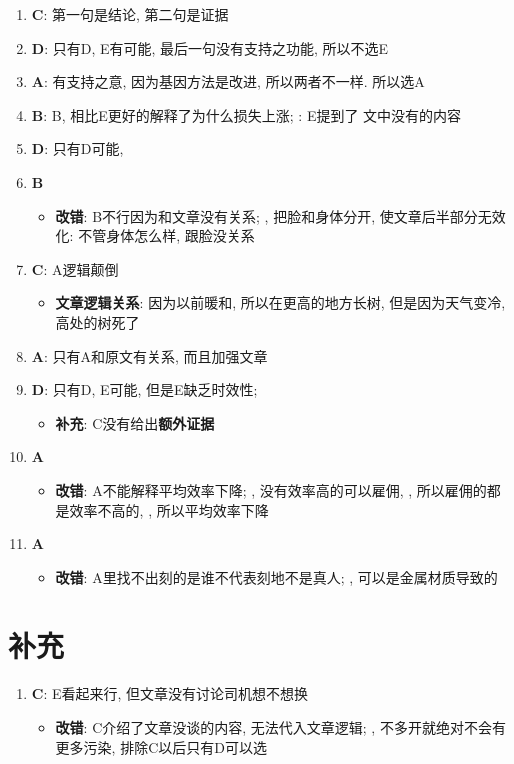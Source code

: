   \begin{enumerate}
    \item \textbf{C}: 第一句是结论, 第二句是证据
    \item \textbf{D}: 只有D, E有可能, 最后一句没有支持之功能, 所以不选E
    \item \textbf{A}: 有支持之意, 因为基因方法是改进, 所以两者不一样.
    所以选A
    \item \textbf{B}: B, 相比E更好的解释了为什么损失上涨; : E提到了
    文中没有的内容
    \item \textbf{D}: 只有D可能, 
    \item \textbf{B}
    \begin{itemize}
      \item \textbf{改错}: B不行因为和文章没有关系;
      , 把脸和身体分开, 使文章后半部分无效化: 不管身体怎么样, 跟脸没关系
    \end{itemize}

    \item \textbf{C}: A逻辑颠倒
    \begin{itemize}
      \item \textbf{文章逻辑关系}: 因为以前暖和, 所以在更高的地方长树, 但是因为天气变冷,
      高处的树死了
    \end{itemize}

    \item \textbf{A}: 只有A和原文有关系, 而且加强文章
    \item \textbf{D}: 只有D, E可能, 但是E缺乏时效性;
    \begin{itemize}
      \item \textbf{补充}: C没有给出\textbf{额外证据}
    \end{itemize}

    \item \textbf{A}
    \begin{itemize}
      \item \textbf{改错}: A不能解释平均效率下降; , 没有效率高的可以雇佣,
      , 所以雇佣的都是效率不高的, ,
      所以平均效率下降
    \end{itemize}

    \item \textbf{A}
    \begin{itemize}
      \item \textbf{改错}: A里找不出刻的是谁不代表刻地不是真人; ,
      可以是金属材质导致的
    \end{itemize}
  \end{enumerate}

\section{补充}

  \begin{enumerate}
    \item \textbf{C}: E看起来行, 但文章没有讨论司机想不想换
    \begin{itemize}
      \item \textbf{改错}: C介绍了文章没谈的内容, 无法代入文章逻辑; ,
      不多开就绝对不会有更多污染, 排除C以后只有D可以选
    \end{itemize}
  \end{enumerate}